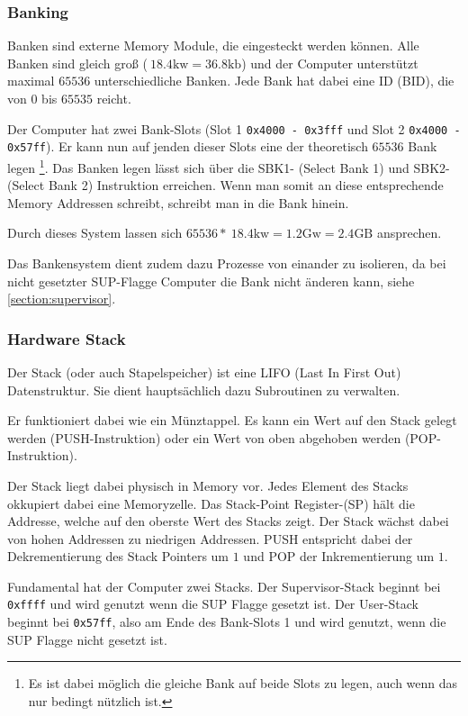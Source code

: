 \documentclass{scrartcl}
\begin{document}
\subsubsection{\label{section:banking}Banking}


Banken sind externe Memory Module, die eingesteckt werden können. Alle Banken sind gleich groß ($~18.4\text{kw} = 36.8\text{kb}$) und der Computer unterstützt maximal $65536$ unterschiedliche Banken. Jede Bank hat dabei eine ID (BID), die von $0$ bis $65535$ reicht.

Der Computer hat zwei Bank-Slots (Slot 1 \texttt{0x4000 - 0x3fff} und Slot 2 \texttt{0x4000 - 0x57ff}). Er kann nun auf jenden dieser Slots eine der theoretisch $65536$ Bank legen
\footnote{Es ist dabei möglich die gleiche Bank auf beide Slots zu legen, auch wenn das nur bedingt nützlich ist.}. Das Banken legen lässt sich über die SBK1- (Select Bank 1) und SBK2- (Select Bank 2) Instruktion erreichen.
Wenn man somit an diese entsprechende Memory Addressen schreibt, schreibt man in die Bank hinein.

Durch dieses System lassen sich $65536 * ~18.4\text{kw} = 1.2\text{Gw} = 2.4\text{GB}$ ansprechen.

Das Bankensystem dient zudem dazu Prozesse von einander zu isolieren, da bei nicht gesetzter SUP-Flagge Computer die Bank nicht änderen kann, siehe \autoref{section:supervisor}.

\subsubsection{\label{section:stack}Hardware Stack}

Der Stack (oder auch Stapelspeicher) ist eine LIFO (Last In First Out) Datenstruktur. Sie dient hauptsächlich dazu Subroutinen zu verwalten. 

Er funktioniert dabei wie ein Münztappel. Es kann ein Wert auf den Stack gelegt werden (PUSH-Instruktion) oder ein Wert von oben abgehoben werden (POP-Instruktion).

Der Stack liegt dabei physisch in Memory vor. Jedes Element des Stacks okkupiert dabei eine Memoryzelle. Das Stack-Point Register-(SP) hält die Addresse, welche auf den oberste Wert des Stacks zeigt. Der Stack wächst dabei von hohen Addressen zu niedrigen Addressen. PUSH entspricht dabei der Dekrementierung des Stack Pointers um $1$ und POP der Inkrementierung um $1$.

Fundamental hat der Computer zwei Stacks. Der Supervisor-Stack beginnt bei \texttt{0xffff} und wird genutzt wenn die SUP Flagge gesetzt ist. Der User-Stack beginnt bei \texttt{0x57ff}, also am Ende des Bank-Slots 1 und wird genutzt, wenn die SUP Flagge nicht gesetzt ist.
\end{document}
